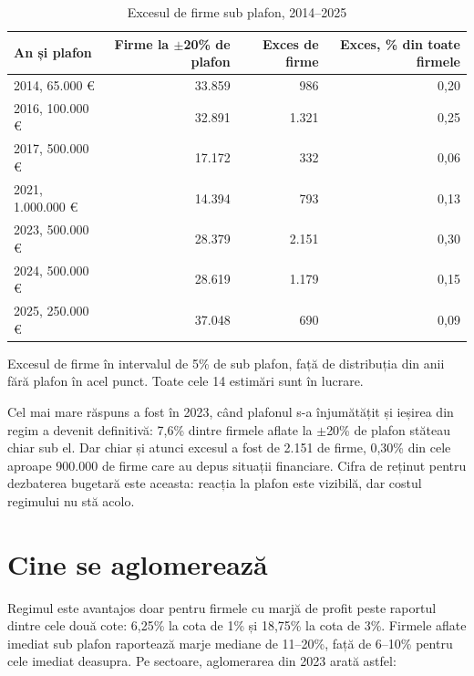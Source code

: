 \documentclass[11pt]{article}
\begin{document}
\begin{table}[!htb]\centering\small
\caption{Excesul de firme sub plafon, 2014--2025}
\begin{tabular}{lrrr}\toprule
An și plafon & Firme la $\pm$20\% de plafon & Exces de firme & Exces, \% din toate firmele \\ \midrule
2014, 65.000 € & 33.859 & 986 & 0,20 \\
2016, 100.000 € & 32.891 & 1.321 & 0,25 \\
2017, 500.000 € & 17.172 & 332 & 0,06 \\
2021, 1.000.000 € & 14.394 & 793 & 0,13 \\
2023, 500.000 € & 28.379 & 2.151 & 0,30 \\
2024, 500.000 € & 28.619 & 1.179 & 0,15 \\
2025, 250.000 € & 37.048 & 690 & 0,09 \\ \bottomrule
\end{tabular}
\begin{minipage}{0.95\linewidth}\vspace{2pt}\footnotesize Excesul de firme în intervalul de 5\% de sub plafon, față de distribuția din anii fără plafon în acel punct. Toate cele 14 estimări sunt în lucrare.\end{minipage}
\end{table}

Cel mai mare răspuns a fost în 2023, când plafonul s-a înjumătățit și ieșirea din regim a devenit definitivă: 7,6\% dintre firmele aflate la $\pm$20\% de plafon stăteau chiar sub el. Dar chiar și atunci excesul a fost de 2.151 de firme, 0,30\% din cele aproape 900.000 de firme care au depus situații financiare. Cifra de reținut pentru dezbaterea bugetară este aceasta: reacția la plafon este vizibilă, dar costul regimului nu stă acolo.

\section{Cine se aglomerează}

Regimul este avantajos doar pentru firmele cu marjă de profit peste raportul dintre cele două cote: 6,25\% la cota de 1\% și 18,75\% la cota de 3\%. Firmele aflate imediat sub plafon raportează marje mediane de 11--20\%, față de 6--10\% pentru cele imediat deasupra. Pe sectoare, aglomerarea din 2023 arată astfel:
\end{document}
